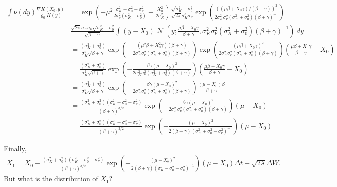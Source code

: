 \documentclass[a4paper]{amsart}
\DeclareMathOperator{\N}{\mathcal{N}}
\begin{document}
\begin{align*}
\int \nu(dy)\frac{\nabla K(X_0, y)}{\varrho_0 K(y)} &= \exp\left( -\mu^2\frac{\sigma_K^2 + \sigma_0^2 - \sigma_{\nu}^2}{2\sigma_{\nu}^2(\sigma_K^2 + \sigma_0^2)} - \frac{X_0^2}{2\sigma_K^2}\right)\frac{\sqrt{\sigma_K^2 + \sigma_0^2}}{\sqrt{2\pi}\sigma_K^3\sigma_{\nu}}\exp\left( \frac{\left((\mu \beta + X_0\gamma)/(\beta + \gamma)\right)^2}{2\sigma_K^2\sigma_{\nu}^2(\sigma_K^2 + \sigma_0^2)(\beta + \gamma)^{-1}}\right)\\
&\frac{\sqrt{2\pi}\sigma_K\sigma_{\nu}\sqrt{\sigma_K^2 + \sigma_0^2}}{\sqrt{\beta + \gamma}}\int (y - X_0)\N\left(y; \frac{\mu \beta + X_0\gamma}{\beta + \gamma}, \sigma_K^2\sigma_{\nu}^2(\sigma_K^2 + \sigma_0^2)(\beta + \gamma)^{-1}\right)\ dy\\
&= \frac{(\sigma_K^2 + \sigma_0^2)}{\sigma_K^2\sqrt{\beta + \gamma}}\exp\left( -\frac{(\mu^2\beta + X_0^2\gamma)(\beta + \gamma)}{2\sigma_K^2\sigma_{\nu}^2(\sigma_K^2 + \sigma_0^2)(\beta + \gamma)}\right)\exp\left( \frac{\left(\mu \beta + X_0\gamma\right)^2}{2\sigma_K^2\sigma_{\nu}^2(\sigma_K^2 + \sigma_0^2)(\beta + \gamma)}\right)\left(\frac{\mu \beta + X_0\gamma}{\beta + \gamma} - X_0\right)\\
&= \frac{(\sigma_K^2 + \sigma_0^2)}{\sigma_K^2\sqrt{\beta + \gamma}}\exp\left( -\frac{\beta\gamma\left(\mu - X_0\right)^2}{2\sigma_K^2\sigma_{\nu}^2(\sigma_K^2 + \sigma_0^2)(\beta + \gamma)}\right)\left(\frac{\mu \beta + X_0\gamma}{\beta + \gamma} - X_0\right)\\
&= \frac{(\sigma_K^2 + \sigma_0^2)}{\sigma_K^2\sqrt{\beta + \gamma}}\exp\left(- \frac{\beta\gamma\left(\mu - X_0\right)^2}{2\sigma_K^2\sigma_{\nu}^2(\sigma_K^2 + \sigma_0^2)(\beta + \gamma)}\right)\frac{(\mu - X_0)\beta}{\beta + \gamma}\\
&= \frac{(\sigma_K^2 + \sigma_0^2)(\sigma_K^2 + \sigma_0^2 - \sigma_{\nu}^2)}{(\beta + \gamma)^{3/2}}\exp\left(- \frac{\beta\gamma\left(\mu - X_0\right)^2}{2\sigma_K^2\sigma_{\nu}^2(\sigma_K^2 + \sigma_0^2)(\beta + \gamma)}\right)(\mu - X_0)\\
&= \frac{(\sigma_K^2 + \sigma_0^2)(\sigma_K^2 + \sigma_0^2 - \sigma_{\nu}^2)}{(\beta + \gamma)^{3/2}}\exp\left(- \frac{\left(\mu - X_0\right)^2}{2(\beta + \gamma)(\sigma_K^2 + \sigma_0^2 - \sigma_{\nu}^2)^{-1}}\right)(\mu - X_0)
\end{align*}

Finally,
\begin{align*}
X_1 = X_0 -\frac{(\sigma_K^2 + \sigma_0^2)(\sigma_K^2 + \sigma_0^2 - \sigma_{\nu}^2)}{(\beta + \gamma)^{3/2}}\exp\left(- \frac{\left(\mu - X_0\right)^2}{2(\beta + \gamma)(\sigma_K^2 + \sigma_0^2 - \sigma_{\nu}^2)^{-1}}\right)(\mu - X_0) \Delta t + \sqrt{2\lambda}\Delta W_1
\end{align*}
But what is the distribution of $X_1$?
\end{document}
